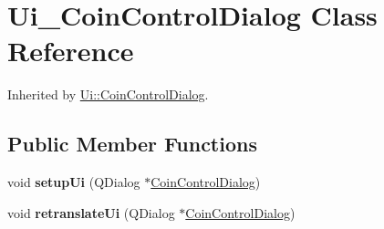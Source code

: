 \hypertarget{class_ui___coin_control_dialog}{}\section{Ui\+\_\+\+Coin\+Control\+Dialog Class Reference}
\label{class_ui___coin_control_dialog}


Inherited by \mbox{\hyperlink{class_ui_1_1_coin_control_dialog}{Ui\+::\+Coin\+Control\+Dialog}}.

\subsection*{Public Member Functions}
\begin{DoxyCompactItemize}
\item 
\mbox{\label{class_ui___coin_control_dialog_a0e98c9388e6c561f2ca526e3f8c05ee0}} 
void {\bfseries setup\+Ui} (Q\+Dialog $\ast$\mbox{\hyperlink{class_coin_control_dialog}{Coin\+Control\+Dialog}})
\item 
\mbox{\label{class_ui___coin_control_dialog_a544f65789ac8a27ac14d1d8940049348}} 
void {\bfseries retranslate\+Ui} (Q\+Dialog $\ast$\mbox{\hyperlink{class_coin_control_dialog}{Coin\+Control\+Dialog}})
\end{DoxyCompactItemize}
